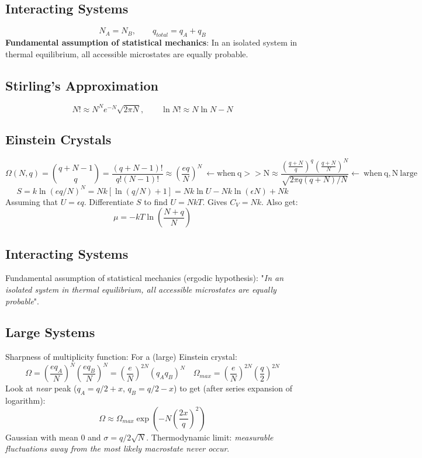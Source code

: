 \documentclass[a4paper,norsk, 10pt]{article}
\begin{document}
\subsection{Interacting Systems}
\begin{equation}
N_A = N_B, \qquad q_{total} = q_A + q_B
\end{equation}
\textbf{Fundamental assumption of statistical mechanics}: In an isolated system in thermal equilibrium, all accessible microstates are equally probable.
\subsection{Stirling's Approximation}
\begin{equation}
N!\approx N^Ne^{-N}\sqrt{2\pi N},\qquad \ln N! \approx N\ln N - N
\end{equation}
\subsection{Einstein Crystals}
\begin{equation}
\Omega(N,q)={q+N-1\choose q}=\frac{(q+N-1)!}{q!(N-1)!}\approx \left(\frac{eq}{N}\right)^N\ \leftarrow \mathrm{when\ q>>N} \approx \frac{\left(\frac{q+N}{q}\right)^q\left(\frac{q+N}{N}\right)^N}{\sqrt{2\pi q(q+N)/N}} \leftarrow\ \mathrm{when\ q,N\ large}
\end{equation}
\begin{equation}
S=k\ln (eq/N)^N=Nk[\ln(q/N)+1]=Nk\ln U-Nk\ln(\epsilon N)+Nk
\end{equation}
Assuming that $U=\epsilon q$. Differentiate $S$ to find $U=NkT$. Gives $C_V=Nk$. Also get:
\begin{equation}
\mu = -kT\ln \left(\frac{N+q}{N}\right)
\end{equation}
\subsection{Interacting Systems}
Fundamental assumption of statistical mechanics (ergodic hypothesis): "\textit{In an isolated system in thermal equilibrium, all accessible microstates are equally probable}".
\subsection{Large Systems}
Sharpness of multiplicity function: For a (large) Einstein crystal:
\begin{equation}
\Omega = \left(\frac{eq_A}{N}\right)^N\left(\frac{eq_B}{N}\right)^N = \left(\frac{e}{N}\right)^{2N}(q_Aq_B)^N \quad \Omega_{max}=\left(\frac{e}{N}\right)^{2N}\left(\frac{q}{2}\right)^{2N}
\end{equation}
Look at \textit{near} peak ($q_A=q/2+x$, $q_B=q/2-x$) to get (after series expansion of logarithm):
\begin{equation}
\Omega \approx \Omega_{max}\exp\left(-N\left(\frac{2x}{q}\right)^2\right)
\end{equation}
Gaussian with mean $0$ and $\sigma=q/2\sqrt{N}$. Thermodynamic limit: \textit{measurable fluctuations away from the most likely macrostate never occur}.
\end{document}
